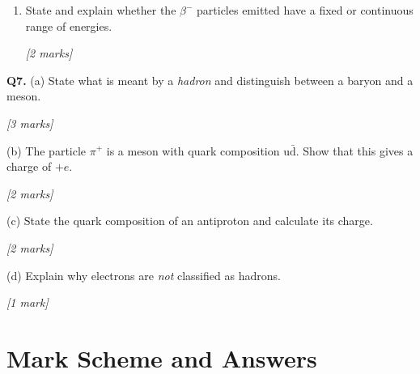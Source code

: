 \begin{tcolorbox}[colback=white, colframe=midblue, breakable]
\begin{enumerate}[label=(\alph*)]
  \item \begin{minipage}[t]{\linewidth}
  State and explain whether the $\beta^-$ particles emitted have a fixed or continuous range of energies.
  \par\hfill\textit{[2 marks]}
  \vspace{3cm}
  \end{minipage}
\end{enumerate}

\begin{minipage}{\linewidth}
\textbf{Q7.} (a) State what is meant by a \textit{hadron} and distinguish between a baryon and a meson.
\par\hfill\textit{[3 marks]}
\vspace{3.5cm}

(b) The particle $\pi^+$ is a meson with quark composition u$\bar{\text{d}}$. Show that this gives a charge of $+e$.
\par\hfill\textit{[2 marks]}
\vspace{3cm}

(c) State the quark composition of an antiproton and calculate its charge.
\par\hfill\textit{[2 marks]}
\vspace{3cm}

(d) Explain why electrons are \emph{not} classified as hadrons.
\par\hfill\textit{[1 mark]}
\vspace{2.5cm}
\end{minipage}

\end{tcolorbox}


\pagebreak


\section{Mark Scheme and Answers}

